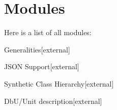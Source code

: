 \section{Modules}
Here is a list of all modules\+:\begin{DoxyCompactList}
\item {}
\item Generalities{\ttfamily  \mbox{[}external\mbox{]}}\item J\+S\+ON Support{\ttfamily  \mbox{[}external\mbox{]}}\item Synthetic Class Hierarchy{\ttfamily  \mbox{[}external\mbox{]}}\item Db\+U/\+Unit description{\ttfamily  \mbox{[}external\mbox{]}}\end{DoxyCompactList}
